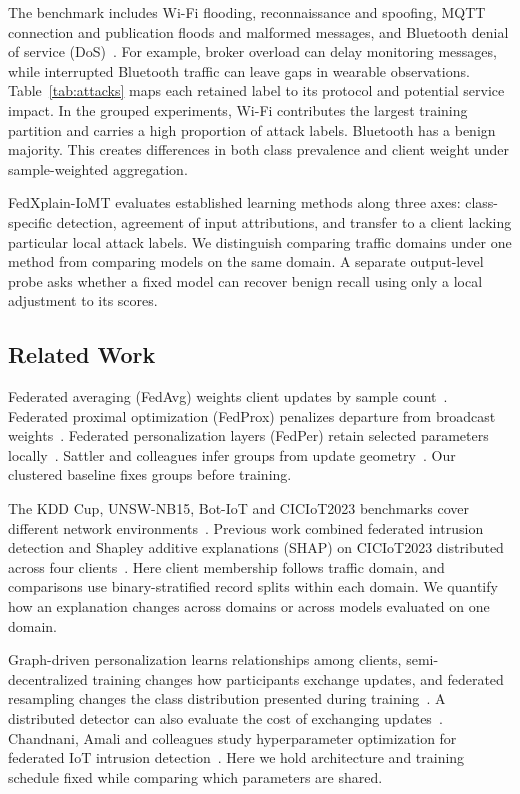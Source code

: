 \documentclass[nolineno]{ieeeaccess}
\begin{document}
The benchmark includes Wi-Fi flooding, reconnaissance and spoofing, MQTT connection and publication floods and malformed messages, and Bluetooth denial of service (DoS)~\cite{dadkhah2024towards}. For example, broker overload can delay monitoring messages, while interrupted Bluetooth traffic can leave gaps in wearable observations. Table~\ref{tab:attacks} maps each retained label to its protocol and potential service impact. In the grouped experiments, Wi-Fi contributes the largest training partition and carries a high proportion of attack labels. Bluetooth has a benign majority. This creates differences in both class prevalence and client weight under sample-weighted aggregation.

FedXplain-IoMT evaluates established learning methods along three axes: class-specific detection, agreement of input attributions, and transfer to a client lacking particular local attack labels. We distinguish comparing traffic domains under one method from comparing models on the same domain. A separate output-level probe asks whether a fixed model can recover benign recall using only a local adjustment to its scores.

\subsection{Related Work}\label{sec:related_work}
Federated averaging (FedAvg) weights client updates by sample count~\cite{mcmahan2017communication}. Federated proximal optimization (FedProx) penalizes departure from broadcast weights~\cite{li2020federated}. Federated personalization layers (FedPer) retain selected parameters locally~\cite{arivazhagan2019federated}. Sattler and colleagues infer groups from update geometry~\cite{sattler2020clustered}. Our clustered baseline fixes groups before training.

The KDD Cup, UNSW-NB15, Bot-IoT and CICIoT2023 benchmarks cover different network environments~\cite{tavallaee2009detailed,moustafa2015unsw,koroniotis2019towards,neto2023ciciot2023}. Previous work combined federated intrusion detection and Shapley additive explanations (SHAP) on CICIoT2023 distributed across four clients~\cite{fedxai}. Here client membership follows traffic domain, and comparisons use binary-stratified record splits within each domain. We quantify how an explanation changes across domains or across models evaluated on one domain.

Graph-driven personalization learns relationships among clients, semi-decentralized training changes how participants exchange updates, and federated resampling changes the class distribution presented during training~\cite{graph,semidec,smote}. A distributed detector can also evaluate the cost of exchanging updates~\cite{hada}. Chandnani, Amali and colleagues study hyperparameter optimization for federated IoT intrusion detection~\cite{amali}. Here we hold architecture and training schedule fixed while comparing which parameters are shared.
\end{document}
